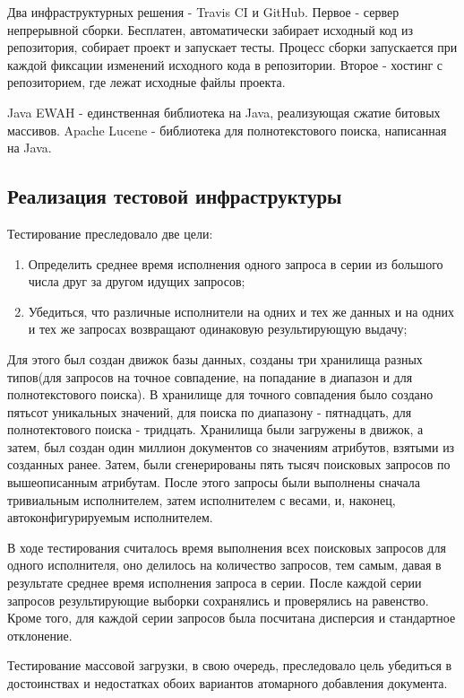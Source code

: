 \documentclass{matmex-diploma}
\begin{document}
\begin{enumerate}
        Два инфраструктурных решения - Travis CI и GitHub. Первое - сервер непрерывной сборки. Бесплатен, автоматически забирает исходный код из репозитория, собирает проект и запускает тесты. Процесс сборки запускается при каждой фиксации изменений исходного кода в репозитории. Второе - хостинг с репозиторием, где лежат исходные файлы проекта. 
        
        Java EWAH - единственная библиотека на Java, реализующая сжатие битовых массивов. Apache Lucene - библиотека для полнотекстового поиска, написанная на Java.
        \end{enumerate}
    \subsection{Реализация тестовой инфраструктуры}
        Тестирование преследовало две цели:
            \begin{enumerate}
                \item Определить среднее время исполнения одного запроса в серии из большого числа друг за другом идущих запросов;
                \item Убедиться, что различные исполнители на одних и тех же данных и на одних и тех же запросах возвращают одинаковую результирующую выдачу;
            \end{enumerate}
        Для этого был создан движок базы данных, созданы три хранилища разных типов(для запросов на точное совпадение, на попадание в диапазон и для полнотекстового поиска). В хранилище для точного совпадения было создано пятьсот уникальных значений, для поиска по диапазону - пятнадцать, для полнотектового поиска - тридцать. Хранилища были загружены в движок, а затем, был создан один миллион документов со значениям атрибутов, взятыми из созданных ранее. Затем, были сгенерированы пять тысяч поисковых запросов по вышеописанным атрибутам. После этого запросы были выполнены сначала тривиальным исполнителем, затем исполнителем с весами, и, наконец, автоконфигурируемым исполнителем. 
            
        В ходе тестирования считалось время выполнения всех поисковых запросов для одного исполнителя, оно делилось на количество запросов, тем самым, давая в результате среднее время исполнения запроса в серии. После каждой серии запросов результирующие выборки сохранялись и проверялись на равенство. Кроме того, для каждой серии запросов была посчитана дисперсия и стандартное отклонение.
        
        Тестирование массовой загрузки, в свою очередь, преследовало цель убедиться в достоинствах и недостатках обоих вариантов атомарного добавления документа.
        
\end{document}
